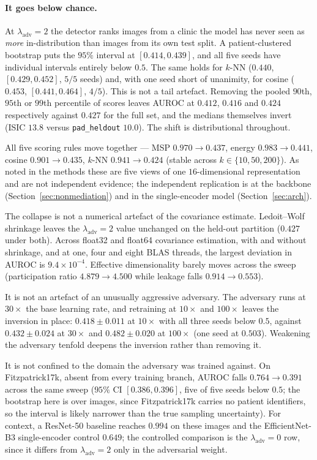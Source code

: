 \documentclass[11pt,a4paper]{article}
\newcommand{\lam}{\lambda_{\mathrm{adv}}}
\begin{document}
\paragraph{It goes below chance.} At $\lam = 2$ the detector ranks images from a clinic
the model has never seen as \emph{more} in-distribution than images from its own test
split. A patient-clustered bootstrap puts the $95\%$ interval at $[0.414, 0.439]$, and
all five seeds have individual intervals entirely below $0.5$. The same holds for
$k$-NN ($0.440$, $[0.429, 0.452]$, $5/5$ seeds) and, with one seed short of unanimity,
for cosine ($0.453$, $[0.441, 0.464]$, $4/5$). This is not a tail artefact. Removing the pooled $90$th, $95$th or $99$th
percentile of scores leaves AUROC at $0.412$, $0.416$ and $0.424$ respectively against
$0.427$ for the full set, and the medians themselves invert (ISIC $13.8$ versus
\texttt{pad\_heldout} $10.0$). The shift is distributional throughout.

All five scoring rules move together --- MSP $0.970 \to 0.437$, energy
$0.983 \to 0.441$, cosine $0.901 \to 0.435$, $k$-NN $0.941 \to 0.424$ (stable across
$k \in \{10, 50, 200\}$). As noted in the methods these are five views of one
$16$-dimensional representation and are not independent evidence; the independent
replication is at the backbone (Section~\ref{sec:nonmediation}) and in the
single-encoder model (Section~\ref{sec:arch}).

The collapse is not a numerical artefact of the covariance estimate. Ledoit--Wolf
shrinkage leaves the $\lam = 2$ value unchanged on the held-out partition ($0.427$ under
both). Across float32 and float64 covariance estimation, with and without shrinkage, and
at one, four and eight BLAS threads, the largest deviation in AUROC is
$9.4 \times 10^{-4}$. Effective
dimensionality barely moves across the sweep (participation ratio $4.879 \to 4.500$
while leakage falls $0.914 \to 0.553$).

It is not an artefact of an unusually aggressive adversary. The adversary runs at
$30\times$ the base learning rate, and retraining at $10\times$ and $100\times$ leaves
the inversion in place: $0.418 \pm 0.011$ at $10\times$ with all three seeds below
$0.5$, against $0.432 \pm 0.024$ at $30\times$ and $0.482 \pm 0.020$ at $100\times$
(one seed at $0.503$). Weakening the adversary tenfold deepens the inversion rather
than removing it.

It is not confined to the domain the adversary was trained against. On Fitzpatrick17k,
absent from every training branch, AUROC falls $0.764 \to 0.391$ across the same sweep
($95\%$ CI $[0.386, 0.396]$, five of five seeds below $0.5$; the bootstrap here is over
images, since Fitzpatrick17k carries no patient identifiers, so the interval is likely
narrower than the true sampling uncertainty).
For context, a ResNet-50 baseline reaches $0.994$ on these images and the
EfficientNet-B3 single-encoder control $0.649$; the controlled comparison is the
$\lam = 0$ row, since it differs from $\lam = 2$ only in the adversarial weight.
\end{document}
